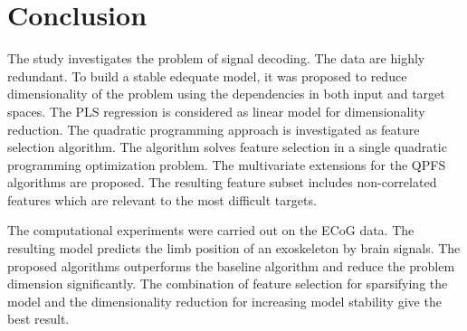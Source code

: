\documentclass[12pt,twoside]{article}
\theoremstyle{definition}
\begin{document}
\section{Conclusion}
The study investigates the problem of signal decoding. 
The data are highly redundant.
To build a stable edequate model, it was proposed to reduce dimensionality of the problem using the dependencies in both input and target spaces.
The PLS regression is considered as linear model for dimensionality reduction.
The quadratic programming approach is investigated as feature selection algorithm.
The algorithm solves feature selection in a single quadratic programming optimization problem.
The multivariate extensions for the QPFS algorithms are proposed.
The resulting feature subset includes non-correlated features which are relevant to the most difficult targets.

The computational experiments were carried out on the ECoG data. 
The resulting model predicts the limb position of an exoskeleton by brain signals.
The proposed algorithms outperforms the baseline algorithm and reduce the problem dimension significantly.
The combination of feature selection for sparsifying the model and the dimensionality reduction for increasing model stability give the best result.



\end{document}
